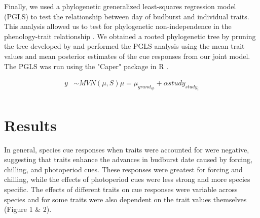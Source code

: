 \documentclass{article}\usepackage[]{graphicx}\usepackage[]{color}
\begin{document}

Finally, we used a phylogenetic greneralized least-squares regression model (PGLS) to test the relationship between day of budburst and individual traits. This analysis allowed us to test for phylogenetic non-independence in the phenology-trait relationship \citep{Freckleton2002}. We obtained a rooted phylogenetic tree by pruning the tree developed by \citep{Smith2018} and performed the PGLS analysis using the mean trait values and mean posterior estimates of the cue responses from our joint model. The PGLS was run using the "Caper" package in R \citep{Orne2013}.


\begin{align*}
y & \sim MVN(\mu, S)
\mu = \mu_{grand_{sp}} + \alpha study_{study_i} \\
\end{align*}

\section{Results}

In general, species cue responses when traits were accounted for were negative, suggesting that traits enhance the advances in budburst date caused by forcing, chilling, and photoperiod cues. These responses were greatest for forcing and chilling, while the effects of photoperiod cues were less strong and more species specific. The effects of different traits on cue responses were variable across species and for some traits were also dependent on the trait values themselves (Figure 1 \& 2).
\end{document}
